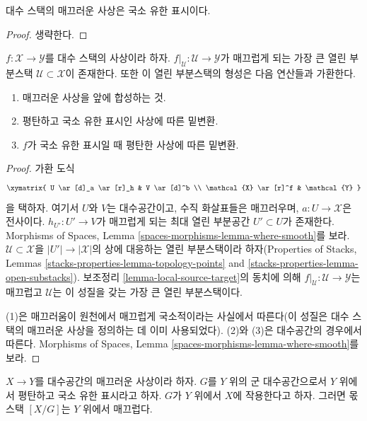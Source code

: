 \begin{lemma}
\label{lemma-smooth-locally-finite-presentation}
대수 스택의 매끄러운 사상은 국소 유한 표시이다.
\end{lemma}

\begin{proof}
생략한다.
\end{proof}

\begin{lemma}
\label{lemma-where-smooth}
$f : \mathcal{X} \to \mathcal{Y}$를 대수 스택의 사상이라 하자.
$f|_\mathcal{U} : \mathcal{U} \to \mathcal{Y}$가 매끄럽게 되는 가장 큰
열린 부분스택 $\mathcal{U} \subset \mathcal{X}$이 존재한다. 또한 이
열린 부분스택의 형성은 다음 연산들과 가환한다.
\begin{enumerate}
\item 매끄러운 사상을 앞에 합성하는 것.
\item 평탄하고 국소 유한 표시인 사상에 따른 밑변환.
\item $f$가 국소 유한 표시일 때 평탄한 사상에 따른 밑변환.
\end{enumerate}
\end{lemma}

\begin{proof}
가환 도식
$$
\xymatrix{
U \ar[d]_a \ar[r]_h & V \ar[d]^b \\
\mathcal{X} \ar[r]^f & \mathcal{Y}
}
$$
을 택하자. 여기서 $U$와 $V$는 대수공간이고, 수직 화살표들은
매끄러우며, $a : U \to \mathcal{X}$은 전사이다.
$h_{U'} : U' \to V$가 매끄럽게 되는 최대 열린 부분공간
$U' \subset U$가 존재한다. Morphisms of Spaces, Lemma
\ref{spaces-morphisms-lemma-where-smooth}를 보라.
$\mathcal{U} \subset \mathcal{X}$을 $|U'| \to |\mathcal{X}|$의 상에
대응하는 열린 부분스택이라 하자(Properties of Stacks, Lemmas
\ref{stacks-properties-lemma-topology-points} and
\ref{stacks-properties-lemma-open-substacks}). 보조정리
\ref{lemma-local-source-target}의 동치에 의해
$f|_\mathcal{U} : \mathcal{U} \to \mathcal{Y}$는 매끄럽고
$\mathcal{U}$는 이 성질을 갖는 가장 큰 열린 부분스택이다.

\medskip\noindent
(1)은 매끄러움이 원천에서 매끄럽게 국소적이라는 사실에서 따른다(이
성질은 대수 스택의 매끄러운 사상을 정의하는 데 이미 사용되었다).
(2)와 (3)은 대수공간의 경우에서 따른다. Morphisms of Spaces, Lemma
\ref{spaces-morphisms-lemma-where-smooth}를 보라.
\end{proof}

\begin{lemma}
\label{lemma-smooth-quotient-stack}
$X \to Y$를 대수공간의 매끄러운 사상이라 하자. $G$를 $Y$ 위의 군
대수공간으로서 $Y$ 위에서 평탄하고 국소 유한 표시라고 하자. $G$가 $Y$ 위에서
$X$에 작용한다고 하자. 그러면 몫스택 $[X/G]$는 $Y$ 위에서 매끄럽다.
\end{lemma}

